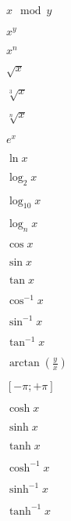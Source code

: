 \documentclass{article}
\begin{document}
$ {x \mod y} $
\pagebreak

$ {x^y} $
\pagebreak

$ {x^n} $
\pagebreak

$ {\sqrt{x}} $
\pagebreak

$ {\sqrt[3]{x}} $
\pagebreak

$ {\sqrt[n]{x}} $
\pagebreak

$ {e^x} $
\pagebreak

$ {\ln {x}} $
\pagebreak

$ {\log_{2} {x}} $
\pagebreak

$ {\log_{10} {x}} $
\pagebreak

$ {\log_{n} {x}} $
\pagebreak

$ {\cos {x}} $
\pagebreak

$ {\sin {x}} $
\pagebreak

$ {\tan {x}} $
\pagebreak

$ {\cos^{-1} {x}} $
\pagebreak

$ {\sin^{-1} {x}} $
\pagebreak

$ {\tan^{-1} {x}} $
\pagebreak

$ {\arctan(\frac{y}{x})} $
\pagebreak

$ {[-\pi;+\pi]} $
\pagebreak

$ {\cosh {x}} $
\pagebreak

$ {\sinh {x}} $
\pagebreak

$ {\tanh {x}} $
\pagebreak

$ {\cosh^{-1} {x}} $
\pagebreak

$ {\sinh^{-1} {x}} $
\pagebreak

$ {\tanh^{-1} {x}} $
\pagebreak
\end{document}

